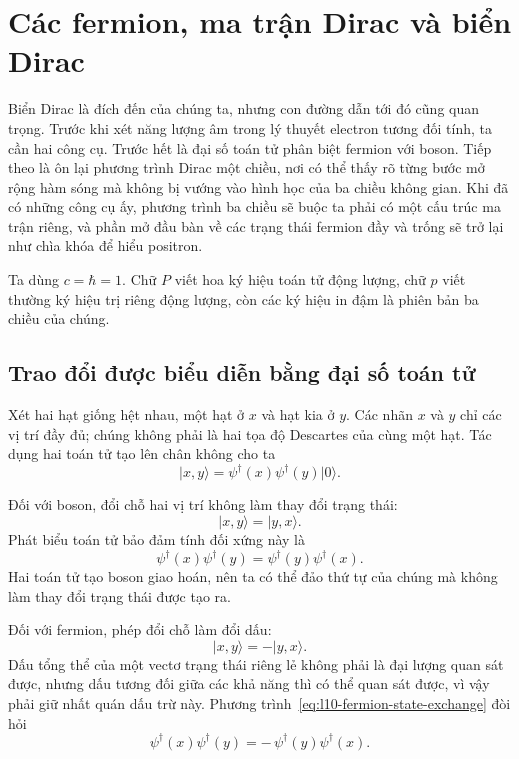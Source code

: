\chapter{Các fermion, ma trận Dirac và biển Dirac}

Biển Dirac là đích đến của chúng ta, nhưng con đường dẫn tới đó cũng quan trọng. Trước khi xét năng lượng âm trong lý thuyết electron tương đối tính, ta cần hai công cụ. Trước hết là đại số toán tử phân biệt fermion với boson. Tiếp theo là ôn lại phương trình Dirac một chiều, nơi có thể thấy rõ từng bước mở rộng hàm sóng mà không bị vướng vào hình học của ba chiều không gian. Khi đã có những công cụ ấy, phương trình ba chiều sẽ buộc ta phải có một cấu trúc ma trận riêng, và phần mở đầu bàn về các trạng thái fermion đầy và trống sẽ trở lại như chìa khóa để hiểu positron.

Ta dùng \(c=\hbar=1\). Chữ \(P\) viết hoa ký hiệu toán tử động lượng, chữ \(p\) viết thường ký hiệu trị riêng động lượng, còn các ký hiệu in đậm là phiên bản ba chiều của chúng.

\section{Trao đổi được biểu diễn bằng đại số toán tử}

Xét hai hạt giống hệt nhau, một hạt ở \(x\) và hạt kia ở \(y\). Các nhãn \(x\) và \(y\) chỉ các vị trí đầy đủ; chúng không phải là hai tọa độ Descartes của cùng một hạt. Tác dụng hai toán tử tạo lên chân không cho ta
\begin{equation}
\lvert x,y\rangle
=
\psi^\dagger(x)\psi^\dagger(y)\lvert0\rangle.
\label{eq:l10-two-particle-state}
\end{equation}

Đối với boson, đổi chỗ hai vị trí không làm thay đổi trạng thái:
\begin{equation}
\lvert x,y\rangle=\lvert y,x\rangle.
\end{equation}
Phát biểu toán tử bảo đảm tính đối xứng này là
\begin{equation}
\psi^\dagger(x)\psi^\dagger(y)
=
\psi^\dagger(y)\psi^\dagger(x).
\label{eq:l10-boson-exchange}
\end{equation}
Hai toán tử tạo boson giao hoán, nên ta có thể đảo thứ tự của chúng mà không làm thay đổi trạng thái được tạo ra.

Đối với fermion, phép đổi chỗ làm đổi dấu:
\begin{equation}
\lvert x,y\rangle=-\lvert y,x\rangle.
\label{eq:l10-fermion-state-exchange}
\end{equation}
Dấu tổng thể của một vectơ trạng thái riêng lẻ không phải là đại lượng quan sát được, nhưng dấu tương đối giữa các khả năng thì có thể quan sát được, vì vậy phải giữ nhất quán dấu trừ này. Phương trình~\eqref{eq:l10-fermion-state-exchange} đòi hỏi
\begin{equation}
\psi^\dagger(x)\psi^\dagger(y)
=
-\,\psi^\dagger(y)\psi^\dagger(x).
\label{eq:l10-fermion-operator-exchange}
\end{equation}

